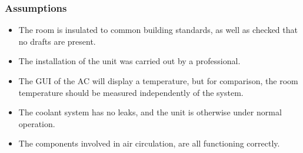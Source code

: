 \documentclass{article}
\begin{document}
\subsubsection{Assumptions}
\begin{itemize}
	\item The room is insulated to common building standards, as well as checked that no drafts are present. 
	\item The installation of the unit was carried out by a professional.
	\item The GUI of the AC will display a temperature, but for comparison, the room temperature should be measured independently of the system.
	\item The coolant system has no leaks, and the unit is otherwise under normal operation.
	\item The components involved in air circulation, are all functioning correctly.
\end{itemize}
\end{document}
